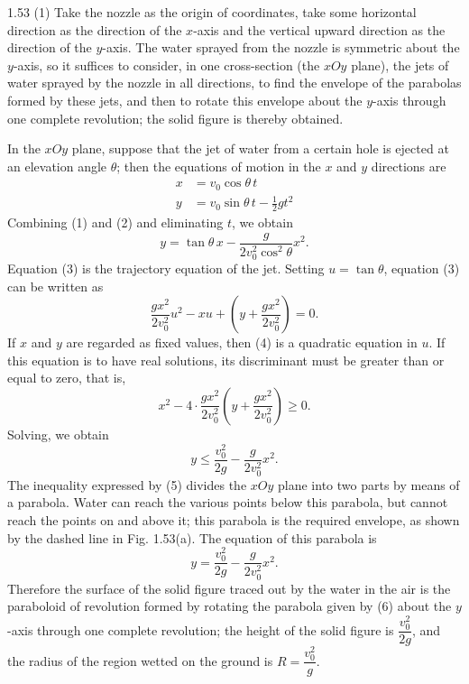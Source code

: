 \begin{solution}{1.53}
(1) Take the nozzle as the origin of coordinates, take some horizontal direction as the direction of the $x$-axis and the vertical upward direction as the direction of the $y$-axis. The water sprayed from the nozzle is symmetric about the $y$-axis, so it suffices to consider, in one cross-section (the $xOy$ plane), the jets of water sprayed by the nozzle in all directions, to find the envelope of the parabolas formed by these jets, and then to rotate this envelope about the $y$-axis through one complete revolution; the solid figure is thereby obtained.

In the $xOy$ plane, suppose that the jet of water from a certain hole is ejected at an elevation angle $\theta$; then the equations of motion in the $x$ and $y$ directions are
\begin{align}
x &= v_0\cos\theta\,t \tag{1}\\
y &= v_0\sin\theta\,t-\frac{1}{2}gt^2 \tag{2}
\end{align}
Combining (1) and (2) and eliminating $t$, we obtain
\begin{equation}
y=\tan\theta\,x-\frac{g}{2v_0^2\cos^2\theta}x^2. \tag{3}
\end{equation}
Equation (3) is the trajectory equation of the jet. Setting $u=\tan\theta$, equation (3) can be written as
\begin{equation}
\frac{gx^2}{2v_0^2}u^2-xu+\left(y+\frac{gx^2}{2v_0^2}\right)=0. \tag{4}
\end{equation}
If $x$ and $y$ are regarded as fixed values, then (4) is a quadratic equation in $u$. If this equation is to have real solutions, its discriminant must be greater than or equal to zero, that is,
\[
x^2-4\cdot\frac{gx^2}{2v_0^2}\left(y+\frac{gx^2}{2v_0^2}\right)\geq 0.
\]
Solving, we obtain
\begin{equation}
y\leq\frac{v_0^2}{2g}-\frac{g}{2v_0^2}x^2. \tag{5}
\end{equation}
The inequality expressed by (5) divides the $xOy$ plane into two parts by means of a parabola. Water can reach the various points below this parabola, but cannot reach the points on and above it; this parabola is the required envelope, as shown by the dashed line in Fig. 1.53(a). The equation of this parabola is
\begin{equation}
y=\frac{v_0^2}{2g}-\frac{g}{2v_0^2}x^2. \tag{6}
\end{equation}
Therefore the surface of the solid figure traced out by the water in the air is the paraboloid of revolution formed by rotating the parabola given by (6) about the $y$-axis through one complete revolution; the height of the solid figure is $\dfrac{v_0^2}{2g}$, and the radius of the region wetted on the ground is $R=\dfrac{v_0^2}{g}$.


\end{solution}
